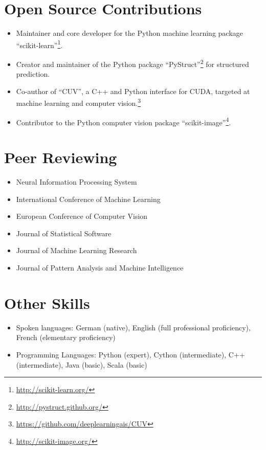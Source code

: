 \documentclass[a4paper,11pt]{article}
\begin{document}
\section{Open Source Contributions}
\begin{itemize}
    \item Maintainer and core developer for the Python machine learning package ``scikit-learn''\footnote{\url{http://scikit-learn.org/}}.
    \item Creator and maintainer of the Python package ``PyStruct''\footnote{\url{http://pystruct.github.org/}} for structured prediction.
    \item Co-author of ``CUV'', a C++ and Python interface for CUDA,
        targeted at machine learning and computer vision.\footnote{\url{https://github.com/deeplearningais/CUV}}
    \item Contributor to the Python computer vision package ``scikit-image''\footnote{\url{http://scikit-image.org/}}.
\end{itemize}
\pagebreak

\section{Peer Reviewing}
\begin{itemize}
    \item Neural Information Processing System
    \item International Conference of Machine Learning
    \item European Conference of Computer Vision
    \item Journal of Statistical Software
    \item Journal of Machine Learning Research
    \item Journal of Pattern Analysis and Machine Intelligence
\end{itemize}

\section{Other Skills}
\begin{itemize}
    \item Spoken languages: German (native), English (full professional proficiency), French (elementary proficiency)
    \item Programming Languages: Python (expert), Cython (intermediate), C++ (intermediate), Java (basic), Scala (basic)
\end{itemize}

\begin{publications}
\end{publications}
\end{document}
